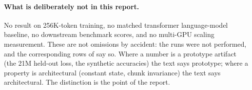 \paragraph{What is deliberately not in this report.}
No result on 256K-token training, no matched transformer language-model baseline, no downstream
benchmark scores, and no multi-GPU scaling measurement. These are not omissions by accident: the
runs were not performed, and the corresponding rows of  say so. Where a number
is a prototype artifact (the 21M held-out loss, the synthetic accuracies) the text says
prototype; where a property is architectural (constant state, chunk invariance) the text says
architectural. The distinction is the point of the report.
